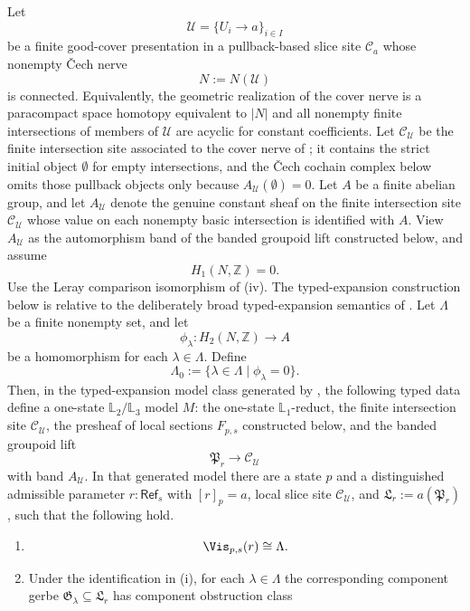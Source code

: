 \begin{theorem}\label{thm:mixed-branch-realization}
Let
\[
\mathcal U=\{U_i\to a\}_{i\in I}
\]
be a finite good-cover presentation in a pullback-based slice site $\mathcal C_a$ whose nonempty \v{C}ech nerve
\[
N:=N(\mathcal U)
\]
is connected. Equivalently, the geometric realization of the cover nerve is a
paracompact space homotopy equivalent to $|N|$ and all nonempty finite
intersections of members of $\mathcal U$ are acyclic for constant
coefficients. Let $\mathcal C_{\mathcal U}$ be the finite intersection site associated to the cover nerve of
; it contains the strict
initial object $\emptyset$ for empty intersections, and the \v{C}ech
cochain complex below omits those pullback objects only because
$A_{\mathcal U}(\emptyset)=0$. Let $A$ be a finite abelian group, and let
$A_{\mathcal U}$ denote the genuine constant sheaf on the finite
intersection site $\mathcal C_{\mathcal U}$ whose value on each nonempty
basic intersection is identified with $A$. View $A_{\mathcal U}$ as the
automorphism band of the banded groupoid lift constructed below, and
assume
\[
H_1(N,\mathbb Z)=0.
\]
Use the Leray comparison isomorphism of
(iv). The typed-expansion
construction below is relative to the deliberately broad
typed-expansion semantics of
. Let $\Lambda$ be a finite nonempty set, and let
\[
\phi_\lambda:H_2(N,\mathbb Z)\to A
\]
be a homomorphism for each $\lambda\in\Lambda$. Define
\[
\Lambda_0:=\{\lambda\in\Lambda\mid \phi_\lambda=0\}.
\]
Then, in the typed-expansion model class generated by
, the following typed data
define a one-state $\mathbb L_2/\mathbb L_3$ model \(M\): the one-state
\(\mathbb L_1\)-reduct, the finite intersection site \(\mathcal C_{\mathcal U}\), the
presheaf of local sections \(F_{p,s}\) constructed below, and the banded groupoid
lift
\[
\mathfrak P_r\to \mathcal C_{\mathcal U}
\]
with band \(A_{\mathcal U}\). In that generated model there are a state
\(p\) and a distinguished admissible parameter \(r:\mathsf{Ref}_s\) with
\([r]_p=a\), local slice site \(\mathcal C_{\mathcal U}\), and
\(\mathfrak L_r:=a(\mathfrak P_r)\), such that the following hold.
\begin{enumerate}[label=(\roman*),nosep]
\item
\[
\Vis_{p,s}(r)\cong \Lambda.
\]
\item Under the identification in \textup{(i)}, for each $\lambda\in\Lambda$ the corresponding component gerbe $\mathfrak G_\lambda\subseteq \mathfrak L_r$ has component obstruction class

\end{enumerate}
\end{theorem}
